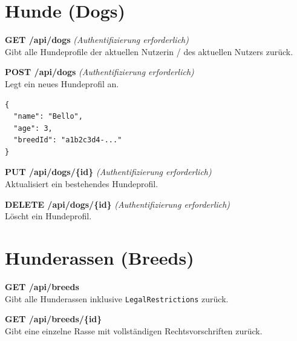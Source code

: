 \section*{Hunde (Dogs)}

\textbf{GET /api/dogs} \quad \textit{(Authentifizierung erforderlich)}\\
Gibt alle Hundeprofile der aktuellen Nutzerin / des aktuellen Nutzers zurück.

\textbf{POST /api/dogs} \quad \textit{(Authentifizierung erforderlich)}\\
Legt ein neues Hundeprofil an.
\begin{lstlisting}[language={}]
{
  "name": "Bello",
  "age": 3,
  "breedId": "a1b2c3d4-..."
}
\end{lstlisting}

\textbf{PUT /api/dogs/\{id\}} \quad \textit{(Authentifizierung erforderlich)}\\
Aktualisiert ein bestehendes Hundeprofil.

\textbf{DELETE /api/dogs/\{id\}} \quad \textit{(Authentifizierung erforderlich)}\\
Löscht ein Hundeprofil.

\section*{Hunderassen (Breeds)}

\textbf{GET /api/breeds}\\
Gibt alle Hunderassen inklusive \texttt{LegalRestrictions} zurück.

\textbf{GET /api/breeds/\{id\}}\\
Gibt eine einzelne Rasse mit vollständigen Rechtsvorschriften zurück.
